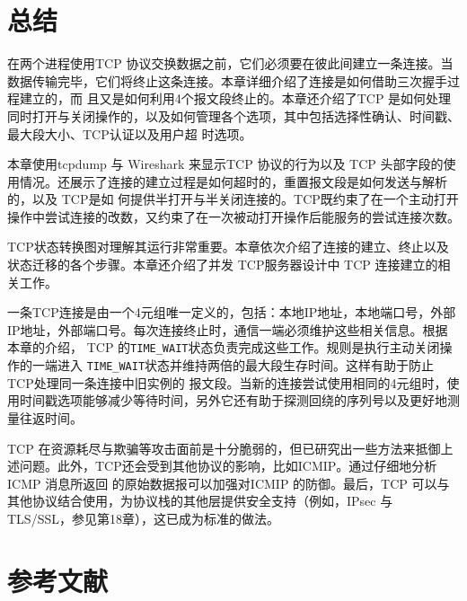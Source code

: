 \section{总结}
在两个进程使用TCP 协议交换数据之前，它们必须要在彼此间建立一条连接。当数据传输完毕，它们将终止这条连接。本章详细介绍了连接是如何借助三次握手过程建立的，而
且又是如何利用4个报文段终止的。本章还介绍了TCP 是如何处理同时打开与关闭操作的，以及如何管理各个选项，其中包括选择性确认、时间戳、最大段大小、TCP认证以及用户超
时选项。

本章使用tcpdump 与 Wireshark 来显示TCP 协议的行为以及 TCP 头部字段的使用情况。还展示了连接的建立过程是如何超时的，重置报文段是如何发送与解析的，以及 TCP是如
何提供半打开与半关闭连接的。TCP既约束了在一个主动打开操作中尝试连接的改数，又约束了在一次被动打开操作后能服务的尝试连接次数。

TCP状态转换图对理解其运行非常重要。本章依次介绍了连接的建立、终止以及状态迁移的各个步骤。本章还介绍了并发 TCP服务器设计中 TCP 连接建立的相关工作。

一条TCP连接是由一个4元组唯一定义的，包括：本地IP地址，本地端口号，外部IP地址，外部端口号。每次连接终止时，通信一端必须维护这些相关信息。根据本章的介绍，
TCP 的\verb|TIME_WAIT|状态负责完成这些工作。规则是执行主动关闭操作的一端进入 \verb|TIME_WAIT|状态并维持两倍的最大段生存时间。这样有助于防止 TCP处理同一条连接中旧实例的
报文段。当新的连接尝试使用相同的4元组时，使用时间戳选项能够减少等待时间，另外它还有助于探测回绕的序列号以及更好地测量往返时间。

TCP 在资源耗尽与欺骗等攻击面前是十分脆弱的，但已研究出一些方法来抵御上述问题。此外，TCP还会受到其他协议的影响，比如ICMIP。通过仔细地分析ICMP 消息所返回
的原始数据报可以加强对ICMIP 的防御。最后，TCP 可以与其他协议结合使用，为协议栈的其他层提供安全支持（例如，IPsec 与 TLS/SSL，参见第18章），这已成为标准的做法。
\section{参考文献}

